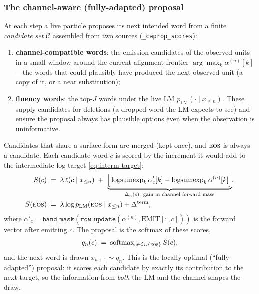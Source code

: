 \documentclass[11pt]{article}
\providecommand{\given}{\mid}
\providecommand{\pLM}{p_{\mathrm{LM}}}
\providecommand{\eos}{\textsc{eos}}
\providecommand{\lse}{\operatorname{logsumexp}}
\providecommand{\softmax}{\operatorname{softmax}}
\providecommand{\code}[1]{\texttt{#1}}
\begin{document}
\subsubsection{The channel-aware (fully-adapted) proposal}
\label{sec:proposal}

At each step a live particle proposes its next intended word from a finite \emph{candidate set} $\mathcal C$ assembled from two sources (\code{\_caprop\_scores}):
\begin{enumerate}[leftmargin=1.8em,itemsep=1pt]
\item \textbf{channel-compatible words}: the emission candidates of the observed units in a small window around the current alignment frontier $\arg\max_k\alpha^{(n)}[k]$---the words that could plausibly have produced the next observed unit (a copy of it, or a near substitution);
\item \textbf{fluency words}: the top-$J$ words under the live LM $\pLM(\cdot\given x_{\le n})$. These supply candidates for deletions (a dropped word the LM expects to see) and ensure the proposal always has plausible options even when the observation is uninformative.
\end{enumerate}
Candidates that share a surface form are merged (kept once), and $\eos$ is always a candidate. Each candidate word $c$ is scored by the increment it would add to the intermediate log-target \eqref{eq:interm-target}:
\begin{align}
  S(c)    &\;=\; \lambda\,\ell(c\given x_{\le n})
            \;+\; \underbrace{\Big[\lse_k \alpha'_c[k] - \lse_k\alpha^{(n)}[k]\Big]}_{
                  \Delta_n(c):\ \text{gain in channel forward mass}}, \label{eq:cand-score}\\
  S(\eos) &\;=\; \lambda\log\pLM(\eos\given x_{\le n}) + \Delta^{\mathrm{term}}, \label{eq:cand-score-eos}
\end{align}
where $\alpha'_c = \texttt{band\_mask}(\texttt{row\_update}(\alpha^{(n)}, \mathrm{EMIT}[:,c]))$ is the forward vector after emitting $c$. The proposal is the softmax of these scores,
\begin{equation}\label{eq:proposal}
  q_n(c) \;=\; \softmax_{c\in\mathcal C\cup\{\eos\}} S(c),
\end{equation}
and the next word is drawn $x_{n+1} \sim q_n$. This is the locally optimal (``fully-adapted'') proposal: it scores each candidate by exactly its contribution to the next target, so the information from \emph{both} the LM and the channel shapes the draw.
\end{document}
